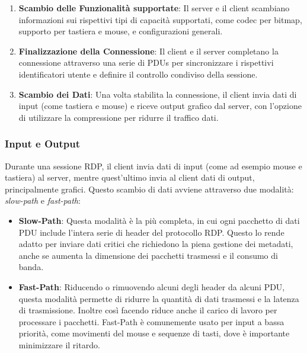 \documentclass[12pt,a4paper,openright,twoside]{book}
\begin{document}
\begin{enumerate}
    \item \textbf{Scambio delle Funzionalità supportate}: Il server e il client scambiano informazioni sui rispettivi tipi di capacità supportati, come codec per bitmap,
    supporto per tastiera e mouse, e configurazioni generali.
    \item \textbf{Finalizzazione della Connessione}: Il client e il server completano la connessione attraverso una serie di \ac{PDU}s per sincronizzare i rispettivi identificatori utente e definire il controllo condiviso della sessione.
    \item \textbf{Scambio dei Dati}: Una volta stabilita la connessione, il client invia dati di input (come tastiera e mouse) e riceve output grafico dal server,
    con l’opzione di utilizzare la compressione per ridurre il traffico dati.
\end{enumerate}

\subsubsection{Input e Output}
Durante una sessione \ac{RDP}, il client invia dati di input (come ad esempio mouse e tastiera) al server, mentre quest'ultimo invia al client dati di output, principalmente grafici.
Questo scambio di dati avviene attraverso due modalità: \textit{slow-path} e \textit{fast-path}:
\begin{itemize}
    \item \textbf{Slow-Path}: Questa modalità è la più completa, in cui ogni pacchetto di dati \ac{PDU} include l'intera serie di header del protocollo \ac{RDP}.
    Questo lo rende adatto per inviare dati critici che richiedono la piena gestione dei metadati, anche se aumenta la dimensione dei pacchetti trasmessi e il consumo di banda.
    \item \textbf{Fast-Path}: Riducendo o rimuovendo alcuni degli header da alcuni \ac{PDU},
    questa modalità permette di ridurre la quantità di dati trasmessi e la latenza di trasmissione.
    Inoltre così facendo riduce anche il carico di lavoro per processare i pacchetti.
    Fast-Path è comunemente usato per input a bassa priorità, come movimenti del mouse e sequenze di tasti, dove è importante minimizzare il ritardo.
\end{itemize}
\end{document}
